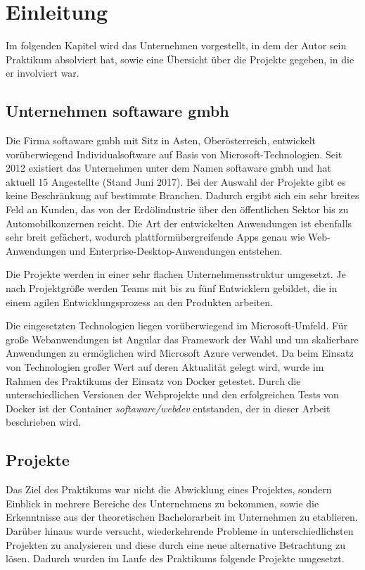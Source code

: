 \chapter{Einleitung}
\label{cha:introduction}

Im folgenden Kapitel wird das Unternehmen vorgestellt, in dem der Autor sein Praktikum absolviert hat, sowie eine Übersicht über die Projekte gegeben, in die er involviert war.

\section{Unternehmen softaware gmbh}
\label{sec:softaware}
Die Firma softaware gmbh mit Sitz in Asten, Oberösterreich, entwickelt vorüberwiegend Individualsoftware auf Basis von Microsoft-Technologien.
Seit 2012 existiert das Unternehmen unter dem Namen softaware gmbh und hat aktuell 15 Angestellte (Stand Juni 2017).
Bei der Auswahl der Projekte gibt es keine Beschränkung auf bestimmte Branchen.
Dadurch ergibt sich ein sehr breites Feld an Kunden, das von der Erdölindustrie über den öffentlichen Sektor bis zu Automobilkonzernen reicht.
Die Art der entwickelten Anwendungen ist ebenfalls sehr breit gefächert, wodurch plattformübergreifende Apps genau wie Web-Anwendungen und Enterprise-Desktop-Anwendungen entstehen.

Die Projekte werden in einer sehr flachen Unternehmensstruktur umgesetzt.
Je nach Projektgröße werden Teams mit bis zu fünf Entwicklern gebildet, die in einem agilen Entwicklungsprozess an den Produkten arbeiten.

Die eingesetzten Technologien liegen vorüberwiegend im Microsoft-Umfeld.
Für große Webanwendungen ist Angular das Framework der Wahl und um skalierbare Anwendungen zu ermöglichen wird Microsoft Azure verwendet.
Da beim Einsatz von Technologien großer Wert auf deren Aktualität gelegt wird, wurde im Rahmen des Praktikums der Einsatz von Docker getestet.
Durch die unterschiedlichen Versionen der Webprojekte und den erfolgreichen Tests von Docker ist der Container \emph{softaware/webdev} entstanden, der in dieser Arbeit beschrieben wird.


\section{Projekte}
\label{sec:projects}

Das Ziel des Praktikums war nicht die Abwicklung eines Projektes, sondern Einblick in mehrere Bereiche des Unternehmens zu bekommen, sowie die Erkenntnisse aus der theoretischen Bachelorarbeit im Unternehmen zu etablieren.
Darüber hinaus wurde versucht, wiederkehrende Probleme in unterschiedlichsten Projekten zu analysieren und diese durch eine neue alternative Betrachtung zu lösen.
Dadurch wurden im Laufe des Praktikums folgende Projekte umgesetzt.

